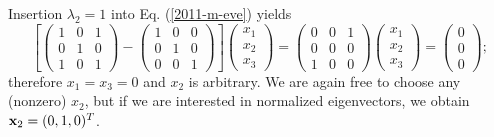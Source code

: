 {Insertion  $\lambda_2=1$ into Eq. (\ref{2011-m-eve}) yields
\begin{equation}
\left[
\left(
\begin{array}{rrrr}
1&0&1\\
0&1&0\\
1&0&1
\end{array}
\right)  -
\left(
\begin{array}{rrrr}
1&0&0\\
0&1&0\\
0&0&1
\end{array}
\right)
\right]
\left(
\begin{array}{rrrr}
x_1\\
x_2\\
x_3
\end{array}
\right)
=
\left(
\begin{array}{rrrr}
0&0&1\\
0&0&0\\
1&0&0
\end{array}
\right)
\left(
\begin{array}{rrrr}
x_1\\
x_2\\
x_3
\end{array}
\right)
=
\left(
\begin{array}{rrrr}
0\\
0\\
0
\end{array}
\right)
;
\end{equation}
therefore $x_1=x_3=0$ and $x_2$ is arbitrary.
We are again free to choose any (nonzero) $x_2$,
but if we are interested in normalized eigenvectors, we obtain
${\bf x}_2 = (0,1,0)^T$.


}
